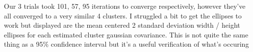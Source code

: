 \begin{answer}
\begin{figure}[H]
	\end{figure}
	Our 3 trials took 101, 57, 95 iterations to converge respectively, however they've all converged to a very similar 4 clusters. I struggled a bit to get the ellipses to work but displayed are the mean centered 2 standard deviation width / height ellipses for each estimated cluster gaussian covariance. This is not quite the same thing as a 95\% confidence interval but it's a useful verification of what's occuring
\end{answer}
%


